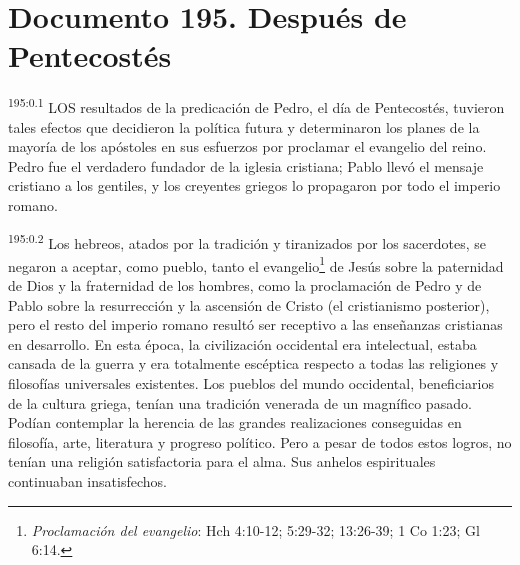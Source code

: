 \chapter{Documento 195. Después de Pentecostés}
\par 
\textsuperscript{195:0.1} LOS resultados de la predicación de Pedro, el día de Pentecostés, tuvieron tales efectos que decidieron la política futura y determinaron los planes de la mayoría de los apóstoles en sus esfuerzos por proclamar el evangelio del reino. Pedro fue el verdadero fundador de la iglesia cristiana; Pablo llevó el mensaje cristiano a los gentiles, y los creyentes griegos lo propagaron por todo el imperio romano.

\par 
\textsuperscript{195:0.2} Los hebreos, atados por la tradición y tiranizados por los sacerdotes, se negaron a aceptar, como pueblo, tanto el evangelio\footnote{\textit{Proclamación del evangelio}: Hch 4:10-12; 5:29-32; 13:26-39; 1 Co 1:23; Gl 6:14.} de Jesús sobre la paternidad de Dios y la fraternidad de los hombres, como la proclamación de Pedro y de Pablo sobre la resurrección y la ascensión de Cristo (el cristianismo posterior), pero el resto del imperio romano resultó ser receptivo a las enseñanzas cristianas en desarrollo. En esta época, la civilización occidental era intelectual, estaba cansada de la guerra y era totalmente escéptica respecto a todas las religiones y filosofías universales existentes. Los pueblos del mundo occidental, beneficiarios de la cultura griega, tenían una tradición venerada de un magnífico pasado. Podían contemplar la herencia de las grandes realizaciones conseguidas en filosofía, arte, literatura y progreso político. Pero a pesar de todos estos logros, no tenían una religión satisfactoria para el alma. Sus anhelos espirituales continuaban insatisfechos.


